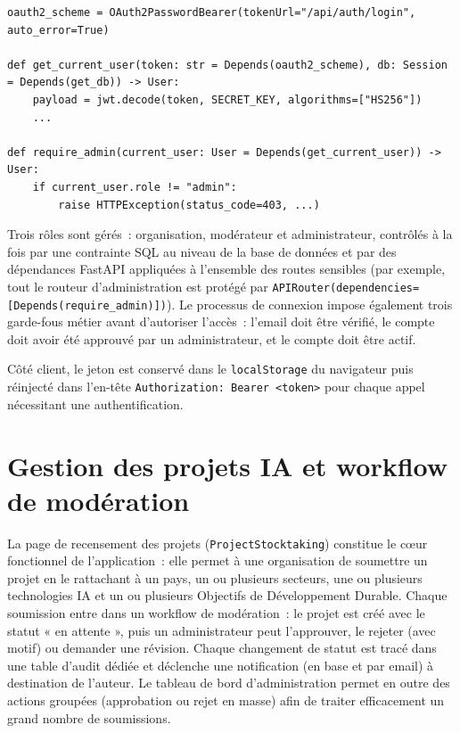 \documentclass[11pt,a4paper]{report}
\begin{document}
\begin{lstlisting}
oauth2_scheme = OAuth2PasswordBearer(tokenUrl="/api/auth/login", auto_error=True)

def get_current_user(token: str = Depends(oauth2_scheme), db: Session = Depends(get_db)) -> User:
    payload = jwt.decode(token, SECRET_KEY, algorithms=["HS256"])
    ...

def require_admin(current_user: User = Depends(get_current_user)) -> User:
    if current_user.role != "admin":
        raise HTTPException(status_code=403, ...)
\end{lstlisting}

Trois rôles sont gérés~: organisation, modérateur et administrateur, contrôlés à la fois par une contrainte
SQL au niveau de la base de données et par des dépendances FastAPI appliquées à l'ensemble des routes
sensibles (par exemple, tout le routeur d'administration est protégé par
\texttt{APIRouter(dependencies=[Depends(require\_admin)])}). Le processus de connexion impose également
trois garde-fous métier avant d'autoriser l'accès~: l'email doit être vérifié, le compte doit avoir été
approuvé par un administrateur, et le compte doit être actif.

Côté client, le jeton est conservé dans le \texttt{localStorage} du navigateur puis réinjecté dans l'en-tête
\texttt{Authorization: Bearer <token>} pour chaque appel nécessitant une authentification.

\section{Gestion des projets IA et workflow de modération}

La page de recensement des projets (\texttt{ProjectStocktaking}) constitue le cœur fonctionnel de
l'application~: elle permet à une organisation de soumettre un projet en le rattachant à un pays, un ou
plusieurs secteurs, une ou plusieurs technologies IA et un ou plusieurs Objectifs de Développement Durable.
Chaque soumission entre dans un workflow de modération~: le projet est créé avec le statut « en attente »,
puis un administrateur peut l'approuver, le rejeter (avec motif) ou demander une révision. Chaque changement
de statut est tracé dans une table d'audit dédiée et déclenche une notification (en base et par email) à
destination de l'auteur. Le tableau de bord d'administration permet en outre des actions groupées
(approbation ou rejet en masse) afin de traiter efficacement un grand nombre de soumissions.
\end{document}
